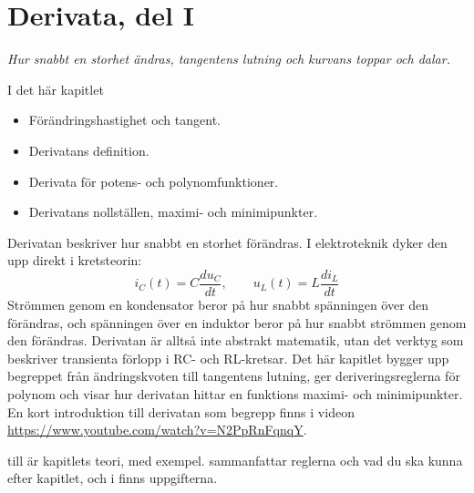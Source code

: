 
\chapter{Derivata, del I}
\label{c12:ch}

{\large\itshape Hur snabbt en storhet ändras, tangentens lutning och kurvans toppar och dalar.\par}

\begin{chapterbox}{I det här kapitlet}
\begin{itemize}
  \item Förändringshastighet och tangent.
  \item Derivatans definition.
  \item Derivata för potens- och polynomfunktioner.
  \item Derivatans nollställen, maximi- och minimipunkter.
\end{itemize}
\end{chapterbox}

Derivatan beskriver hur snabbt en storhet förändras. I elektroteknik dyker den upp direkt i
kretsteorin:
\[
  i_C(t) = C\frac{du_C}{dt}, \qquad u_L(t) = L\frac{di_L}{dt}
\]
Strömmen genom en kondensator beror på hur snabbt spänningen över den förändras, och spänningen
över en induktor beror på hur snabbt strömmen genom den förändras. Derivatan är alltså inte
abstrakt matematik, utan det verktyg som beskriver transienta förlopp i RC- och RL-kretsar. Det
här kapitlet bygger upp begreppet från ändringskvoten till tangentens lutning, ger
deriveringsreglerna för polynom och visar hur derivatan hittar en funktions maximi- och
minimipunkter. En kort introduktion till derivatan som begrepp finns i videon
\url{https://www.youtube.com/watch?v=N2PpRnFqnqY}.

 till  är kapitlets teori, med exempel.
 sammanfattar reglerna och vad du ska kunna efter kapitlet, och i
 finns uppgifterna.




